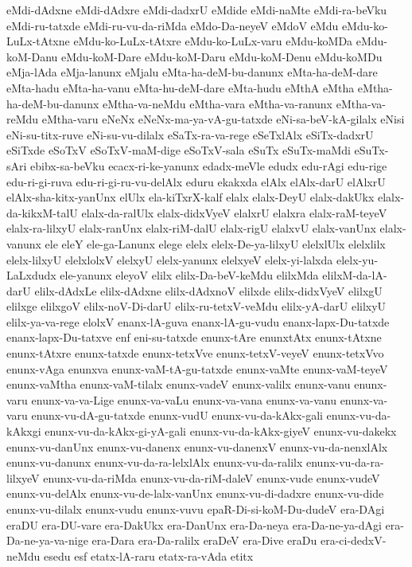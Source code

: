 {eMdi-dAdxne
eMdi-dAdxre
eMdi-dadxrU
eMdide
eMdi-naMte
eMdi-ra-beVku
eMdi-ru-tatxde
eMdi-ru-vu-da-riMda
eMdo-Da-neyeV
eMdoV
eMdu
eMdu-ko-LuLx-tAtxne
eMdu-ko-LuLx-tAtxre
eMdu-ko-LuLx-varu
eMdu-koMDa
eMdu-koM-Danu
eMdu-koM-Dare
eMdu-koM-Daru
eMdu-koM-Denu
eMdu-koMDu
eMja-lAda
eMja-lanunx
eMjalu
eMta-ha-deM-bu-danunx
eMta-ha-deM-dare
eMta-hadu
eMta-ha-vanu
eMta-hu-deM-dare
eMta-hudu
eMthA
eMtha
eMtha-ha-deM-bu-danunx
eMtha-va-neMdu
eMtha-vara
eMtha-va-ranunx
eMtha-va-reMdu
eMtha-varu
eNeNx
eNeNx-ma-ya-vA-gu-tatxde
eNi-sa-beV-kA-gilalx
eNisi
eNi-su-titx-ruve
eNi-su-vu-dilalx
eSaTx-ra-va-rege
eSeTxlAlx
eSiTx-dadxrU
eSiTxde
eSoTxV
eSoTxV-maM-dige
eSoTxV-sala
eSuTx
eSuTx-maMdi
eSuTx-sAri
ebibx-sa-beVku
ecacx-ri-ke-yanunx
edadx-meVle
edudx
edu-rAgi
edu-rige
edu-ri-gi-ruva
edu-ri-gi-ru-vu-delAlx
eduru
ekakxda
elAlx
elAlx-darU
elAlxrU
elAlx-sha-kitx-yanUnx
elUlx
ela-kiTxrX-kalf
elalx
elalx-DeyU
elalx-dakUkx
elalx-da-kikxM-talU
elalx-da-ralUlx
elalx-didxVyeV
elalxrU
elalxra
elalx-raM-teyeV
elalx-ra-lilxyU
elalx-ranUnx
elalx-riM-dalU
elalx-rigU
elalxvU
elalx-vanUnx
elalx-vanunx
ele
eleY
ele-ga-Lanunx
elege
elelx
elelx-De-ya-lilxyU
elelxlUlx
elelxlilx
elelx-lilxyU
elelxlolxV
elelxyU
elelx-yanunx
elelxyeV
elelx-yi-lalxda
elelx-yu-LaLxdudx
ele-yanunx
eleyoV
elilx
elilx-Da-beV-keMdu
elilxMda
elilxM-da-lA-darU
elilx-dAdxLe
elilx-dAdxne
elilx-dAdxnoV
elilxde
elilx-didxVyeV
elilxgU
elilxge
elilxgoV
elilx-noV-Di-darU
elilx-ru-tetxV-veMdu
elilx-yA-darU
elilxyU
elilx-ya-va-rege
elolxV
enanx-lA-guva
enanx-lA-gu-vudu
enanx-lapx-Du-tatxde
enanx-lapx-Du-tatxve
enf
eni-su-tatxde
enunx-tAre
enunxtAtx
enunx-tAtxne
enunx-tAtxre
enunx-tatxde
enunx-tetxVve
enunx-tetxV-veyeV
enunx-tetxVvo
enunx-vAga
enunxva
enunx-vaM-tA-gu-tatxde
enunx-vaMte
enunx-vaM-teyeV
enunx-vaMtha
enunx-vaM-tilalx
enunx-vadeV
enunx-valilx
enunx-vanu
enunx-varu
enunx-va-va-Lige
enunx-va-vaLu
enunx-va-vana
enunx-va-vanu
enunx-va-varu
enunx-vu-dA-gu-tatxde
enunx-vudU
enunx-vu-da-kAkx-gali
enunx-vu-da-kAkxgi
enunx-vu-da-kAkx-gi-yA-gali
enunx-vu-da-kAkx-giyeV
enunx-vu-dakekx
enunx-vu-danUnx
enunx-vu-danenx
enunx-vu-danenxV
enunx-vu-da-nenxlAlx
enunx-vu-danunx
enunx-vu-da-ra-lelxlAlx
enunx-vu-da-ralilx
enunx-vu-da-ra-lilxyeV
enunx-vu-da-riMda
enunx-vu-da-riM-daleV
enunx-vude
enunx-vudeV
enunx-vu-delAlx
enunx-vu-de-lalx-vanUnx
enunx-vu-di-dadxre
enunx-vu-dide
enunx-vu-dilalx
enunx-vudu
enunx-vuvu
epaR-Di-si-koM-Du-dudeV
era-DAgi
eraDU
era-DU-vare
era-DakUkx
era-DanUnx
era-Da-neya
era-Da-ne-ya-dAgi
era-Da-ne-ya-va-nige
era-Dara
era-Da-ralilx
eraDeV
era-Dive
eraDu
era-ci-dedxV-neMdu
esedu
esf
etatx-lA-raru
etatx-ra-vAda
etitx
}
